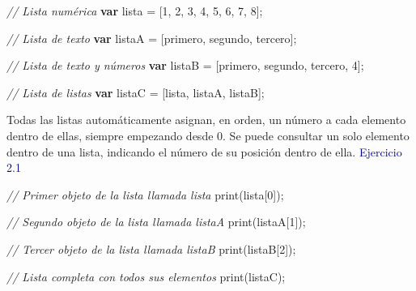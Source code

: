 \documentclass[
  12pt,
  letterpaper,
  twoside]{book}
\newenvironment{Shaded}{\begin{snugshade}}{\end{snugshade}}
\newcommand{\CommentTok}[1]{\textcolor[rgb]{0.24,0.58,0.00}{\textit{#1}}}
\newcommand{\DecValTok}[1]{\textcolor[rgb]{0.28,0.53,0.93}{#1}}
\newcommand{\FunctionTok}[1]{\textcolor[rgb]{0.48,0.12,0.64}{#1}}
\newcommand{\KeywordTok}[1]{\textcolor[rgb]{0.00,0.00,0.00}{\textbf{#1}}}
\newcommand{\NormalTok}[1]{#1}
\newcommand{\OperatorTok}[1]{\textcolor[rgb]{0.00,0.00,0.00}{#1}}
\newcommand{\StringTok}[1]{\textcolor[rgb]{0.87,0.29,0.22}{#1}}
\begin{document}
\begin{Shaded}
\begin{Highlighting}[]
\CommentTok{// Lista numérica}
\KeywordTok{var}\NormalTok{ lista }\OperatorTok{=}\NormalTok{ [}\DecValTok{1}\OperatorTok{,} \DecValTok{2}\OperatorTok{,} \DecValTok{3}\OperatorTok{,} \DecValTok{4}\OperatorTok{,} \DecValTok{5}\OperatorTok{,} \DecValTok{6}\OperatorTok{,} \DecValTok{7}\OperatorTok{,} \DecValTok{8}\NormalTok{]}\OperatorTok{;}   
  
\CommentTok{// Lista de texto            }
\KeywordTok{var}\NormalTok{ listaA }\OperatorTok{=}\NormalTok{ [}\StringTok{\textquotesingle{}primero\textquotesingle{}}\OperatorTok{,} \StringTok{\textquotesingle{}segundo\textquotesingle{}}\OperatorTok{,} \StringTok{\textquotesingle{}tercero\textquotesingle{}}\NormalTok{]}\OperatorTok{;} 
   
\CommentTok{// Lista de texto y números  }
\KeywordTok{var}\NormalTok{ listaB }\OperatorTok{=}\NormalTok{ [}\StringTok{\textquotesingle{}primero\textquotesingle{}}\OperatorTok{,} \StringTok{\textquotesingle{}segundo\textquotesingle{}}\OperatorTok{,} \StringTok{\textquotesingle{}tercero\textquotesingle{}}\OperatorTok{,} \DecValTok{4}\NormalTok{]}\OperatorTok{;} 

\CommentTok{// Lista de listas  }
\KeywordTok{var}\NormalTok{ listaC }\OperatorTok{=}\NormalTok{ [lista}\OperatorTok{,}\NormalTok{ listaA}\OperatorTok{,}\NormalTok{ listaB]}\OperatorTok{;} 
\end{Highlighting}
\end{Shaded}

Todas las listas automáticamente asignan, en orden, un número a cada elemento dentro de ellas, siempre empezando desde 0. Se puede consultar un solo elemento dentro de una lista, indicando el número de su posición dentro de ella.
\newpage
\textcolor{darkblue}{Ejercicio 2.1}

\begin{Shaded}
\begin{Highlighting}[]
\CommentTok{// Primer objeto de la lista llamada \textquotesingle{}lista\textquotesingle{}}
\FunctionTok{print}\NormalTok{(lista[}\DecValTok{0}\NormalTok{])}\OperatorTok{;} 

\CommentTok{// Segundo objeto de la lista llamada \textquotesingle{}listaA\textquotesingle{}}
\FunctionTok{print}\NormalTok{(listaA[}\DecValTok{1}\NormalTok{])}\OperatorTok{;}

\CommentTok{// Tercer objeto de la lista llamada \textquotesingle{}listaB\textquotesingle{}}
\FunctionTok{print}\NormalTok{(listaB[}\DecValTok{2}\NormalTok{])}\OperatorTok{;}

\CommentTok{// Lista completa con todos sus elementos}
\FunctionTok{print}\NormalTok{(listaC)}\OperatorTok{;}    
\end{Highlighting}
\end{Shaded}
\end{document}

